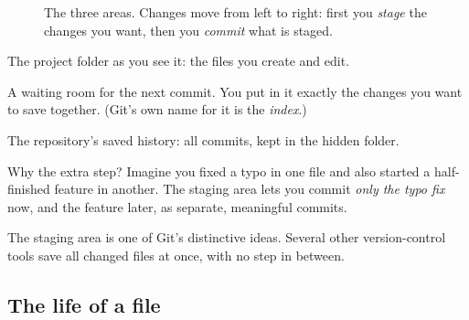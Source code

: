 \begin{figure}[H]
\centering
{}
\caption{The three areas. Changes move from left to right: first you \emph{stage} the changes you want, then you \emph{commit} what is staged.}
\label{fig:areas}
\end{figure}

\begin{description}[leftmargin=1.2em,style=nextline]
\item[Working directory] The project folder as you see it: the files you create and edit.
\item[Staging area] A waiting room for the next commit. You put in it exactly the changes you want to save together. (Git's own name for it is the \emph{index}.)
\item[Repository] The repository's saved history: all commits, kept in the hidden  folder.
\end{description}

Why the extra step? Imagine you fixed a typo in one file and also started a half-finished feature in another. The staging area lets you commit \emph{only the typo fix} now, and the feature later, as separate, meaningful commits.

\begin{quickfact}
The staging area is one of Git's distinctive ideas. Several other version-control tools save all changed files at once, with no step in between.
\end{quickfact}

\subsection{The life of a file}

